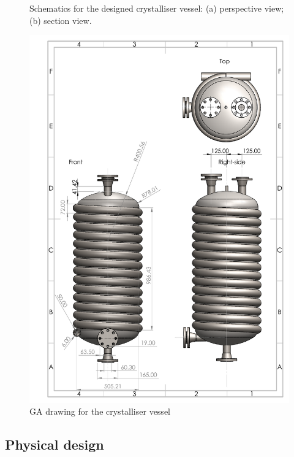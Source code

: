 \begin{figure}[h]
\begin{minipage}[t]{0.5\linewidth}
    \centering
    
    \caption{Schematics for the designed crystalliser vessel: (a) perspective view; (b) section view.}
    \label{fig:crystalliser schematic}
\end{minipage}
\begin{minipage}[t]{0.5\linewidth}
    \centering
    \includegraphics[scale=0.30]{chapters/3-separation/figures/Crystalliser_GA.PDF}
    \caption{GA drawing for the crystalliser vessel}
    \label{fig:crystalliser GA}
\end{minipage}
\end{figure} 

\subsection{Physical design} \label{sec:physical design crystalliser}

